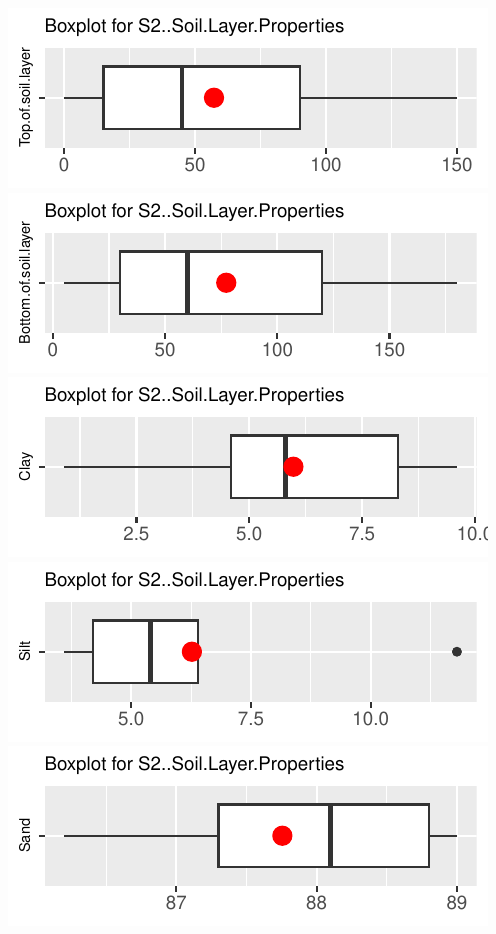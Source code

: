 \documentclass[
]{article}
\begin{document}
\includegraphics{FL_Crop_BMP_QA_single_dataset_files/figure-latex/check-content-of-sheets-51.pdf}
\includegraphics{FL_Crop_BMP_QA_single_dataset_files/figure-latex/check-content-of-sheets-52.pdf}
\includegraphics{FL_Crop_BMP_QA_single_dataset_files/figure-latex/check-content-of-sheets-53.pdf}
\includegraphics{FL_Crop_BMP_QA_single_dataset_files/figure-latex/check-content-of-sheets-54.pdf}
\includegraphics{FL_Crop_BMP_QA_single_dataset_files/figure-latex/check-content-of-sheets-55.pdf}
\end{document}
